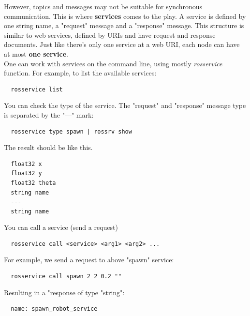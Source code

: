 \documentclass[pdftex,12pt,a4paper]{article}
\begin{document}
  \newpage
  However, topics and messages may not be suitable for synchronous communication. This is where \textbf{services} comes to the play. A service is defined by one string name, a "request" message and a "response" message. This structure is similar to web services, defined by URIs and have request and response documents. Just like there's only one service at a web URI, each node can have at most \textbf{one service}.\\
  One can work with services on the command line, using mostly \textit{rosservice} function. For example, to list the available services:
  \begin{lstlisting}
  rosservice list
  \end{lstlisting}
  You can check the type of the service. The "request" and "response" message type is separated by the "---" mark:
  \begin{lstlisting}
  rosservice type spawn | rossrv show
  \end{lstlisting}
  The result should be like this.
  \begin{lstlisting}
  float32 x
  float32 y
  float32 theta
  string name
  ---
  string name
  \end{lstlisting}
  You can call a service (send a request)
  \begin{lstlisting}
  rosservice call <service> <arg1> <arg2> ...
  \end{lstlisting}
  For example, we send a request to above "spawn" service:
  \begin{lstlisting}
  rosservice call spawn 2 2 0.2 ""
  \end{lstlisting}
  Resulting in a "response of type "string":
  \begin{lstlisting}
  name: spawn_robot_service
  \end{lstlisting}
  
  \newpage
\end{document}
